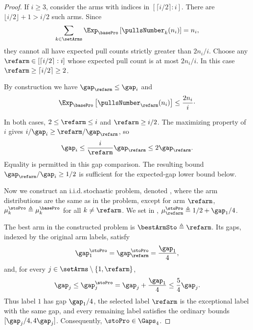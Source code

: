 \begin{proof}
If $i\geq3$, consider the arms with indices in
$[\lceil i/2\rceil:i]$. There are $\lfloor i/2\rfloor+1>i/2$
such arms. Since
\[
\sum_{k\in\setArms}\Exp_{\basePro}\left[\pullsNumber_k(n_i)\right]=n_i,
\]
they cannot all have expected pull counts strictly greater than $2n_i/i$.
Choose any $\refarm\in[\lceil i/2\rceil:i]$ whose expected pull count
is at most $2n_i/i$. In this case $\refarm\geq\lceil i/2\rceil\geq2$.

 By construction we have $\gap_{\refarm}\leq\gap_i$ and
	\begin{equation}\label{eq:notSoMuchPulls}
	\Exp_{\basePro}\left[\pullsNumber_{\refarm}(n_i) \right]\leq \frac{2n_i}{i}\cdot
	\end{equation}

In both cases, $2\leq\refarm\leq i$ and $\refarm\geq i/2$.
The maximizing property of $i$ gives
$i/\gap_i\geq\refarm/\gap_{\refarm}$, so
 \begin{equation}\label{eq:zhihan}
     \gap_i\leq\frac{i}{\refarm}\gap_{\refarm}\leq2\gap_{\refarm}.
 \end{equation}
Equality is permitted in this gap comparison. The resulting bound
$\gap_{\refarm}/\gap_i\geq1/2$ is sufficient for the expected-gap
lower bound below.

	
	
	Now we construct an i.i.d.\,stochastic problem, denoted \stoPro{}, where
	the arm distributions are the same as in the \basePro{}
	problem, except for arm $\refarm$, $\mu^{\stoPro}_{k}\triangleq \mu^{\basePro}_{k} $ 
	for all $k\neq \refarm$.
	We set in  \stoPro{},         
	$\mu^{\stoPro}_{\refarm} \triangleq 1/2 + \gap_1/4$.

The best arm in the constructed \stoPro{} problem is
$\bestArmSto\triangleq\refarm$. Its gaps, indexed by the original arm
labels, satisfy
\[
\gap_1^{\stoPro}=\gap_{\refarm}^{\stoPro}=\frac{\gap_1}{4},
\]
and, for every $j\in\setArms\setminus\{1,\refarm\}$,
\[
\gap_j\leq\gap_j^{\stoPro}
=\gap_j+\frac{\gap_1}{4}\leq\frac54\gap_j.
\]
Thus label $1$ has gap $\gap_1/4$, the selected label $\refarm$ is
the exceptional label with the same gap, and every remaining label
satisfies the ordinary bounds $[\gap_j/4,4\gap_j]$.
Consequently, $\stoPro\in\Gaps_4$.


\end{proof}
